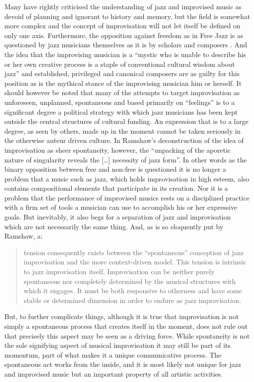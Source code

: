 \documentclass[a4paper]{article}
\begin{document}
Many have rightly criticised the understanding of jazz and improvised music as devoid of planning and ignorant to history and memory, but the field is somewhat more complex and the concept of improvisation will not let itself be defined on only one axis. Furthermore, the opposition against freedom as in Free Jazz is as questioned by jazz musicians themselves as it is by scholars and composers \citep{lewis-1}. And the idea that the improvising musician is a ``mystic who is unable to describe his or her own creative process is a staple of conventional cultural wisdom about jazz'' and established, privileged and canonical composers are as guilty for this position as is the mythical stance of the improvising musician him or herself. It should however be noted that many of the attempts to target improvisation as unforeseen, unplanned, spontaneous and based primarily on ``feelings'' is to a significant degree a political strategy with which jazz musicians has been kept outside the central structures of cultural funding. An expression that is to a large degree, as seen by others, made up in the moment cannot be taken seriously in the otherwise auteur driven culture. In Ramshaw's deconstruction of the idea of improvisation as sheer spontaneity, however, the ``unpacking of the aporetic nature of singularity reveals the [\ldots] necessity of jazz form''. In other words as the binary opposition between free and non-free is questioned it is no longer a problem that a music such as jazz, which holds improvisation in high esteem, also contains compositional elements that participate in its creation. Nor it is a problem that the performance of improvised musics rests on a disciplined practice with a firm set of tools a musician can use to accomplish his or her expressive goals. But inevitably, it also begs for a separation of jazz and improvisation which are not necessarily the same thing. And, as is so eloquently put by Ramshaw, a:

\begin{quote}
 tension consequently exists between the ``spontaneous'' conception of jazz improvisation and   the more context-driven model. This tension is intrinsic to jazz improvisation   itself. Improvisation can be neither purely spontaneous nor completely determined by the   musical structures with which it engages. It must be both responsive to otherness and have   some stable or determined dimension in order to endure as jazz improvisation. \citep{ramshaw2006}
\end{quote}

But, to further complicate things, although it is true that improvisation is not simply a spontaneous process that creates itself in the moment, does not rule out that precisely this aspect may be seen as a driving force. While spontaneity is not the sole signifying aspect of musical improvisation it may still be part of its momentum, part of what makes it a unique communicative process. The spontaneous act works from the inside, and it is most likely not unique for jazz and improvised music but an important property of all artistic activities. 
\end{document}
